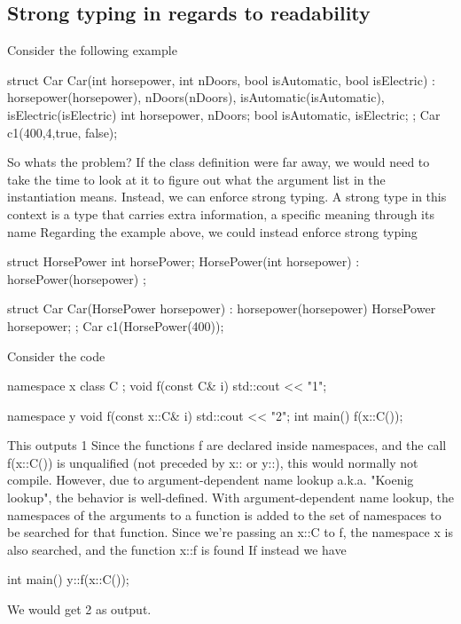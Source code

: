 \documentclass{report}
\begin{document}
\subsection{Strong typing in regards to readability}
\bigbreak \noindent 
Consider the following example
\bigbreak \noindent 
\begin{cppcode}
struct Car {
    Car(int horsepower, int nDoors, bool isAutomatic, bool isElectric)  : horsepower(horsepower), nDoors(nDoors), isAutomatic(isAutomatic), isElectric(isElectric) {}
    int horsepower, nDoors;
    bool isAutomatic, isElectric;
};
Car c1(400,4,true, false);
\end{cppcode}
\bigbreak \noindent 
So whats the problem? If the class definition were far away, we would need to take the time to look at it to figure out what the argument list in the instantiation means. Instead, we can enforce strong typing.
\bigbreak \noindent 
A strong type in this context is a type that carries extra information, a specific meaning through its name
\bigbreak \noindent 
Regarding the example above, we could instead enforce strong typing
\begin{cppcode}
struct HorsePower {
    int horsePower{};
    HorsePower(int horsepower) : horsePower(horsepower) {}
};

struct Car {
    Car(HorsePower horsepower)  : horsepower(horsepower) {}
    HorsePower horsepower;
};
Car c1(HorsePower(400));
\end{cppcode}


\pagebreak 
{}
\bigbreak \noindent 
Consider the code
\bigbreak \noindent 
\begin{cppcode}
namespace x {
  class C {};
  void f(const C& i) {
    std::cout << "1";
  }
}

namespace y {
  void f(const x::C& i) {
    std::cout << "2";
  }
}
int main() {
    f(x::C());
}
\end{cppcode}
\bigbreak \noindent 
This outputs 1
\bigbreak \noindent 
Since the functions f are declared inside namespaces, and the call f(x::C()) is unqualified (not preceded by x:: or y::), this would normally not compile.
\bigbreak \noindent 
However, due to argument-dependent name lookup a.k.a. "Koenig lookup", the behavior is well-defined.
\bigbreak \noindent 
With argument-dependent name lookup, the namespaces of the arguments to a function is added to the set of namespaces to be searched for that function. Since we're passing an x::C to f, the namespace x is also searched, and the function x::f is found
\bigbreak \noindent 
If instead we have
\begin{cppcode}
    int main() {
        y::f(x::C());
    }
\end{cppcode}
\bigbreak \noindent 
We would get 2 as output.
\end{document}
